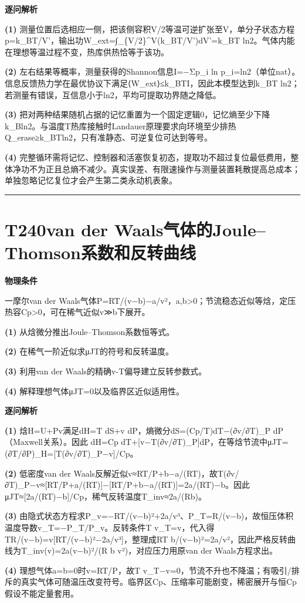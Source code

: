 \documentclass[UTF8,a4paper,11pt,oneside,openany]{ctexbook}
\begin{document}
\par\medskip\noindent\textbf{逐问解析}
\par\noindent\textbf{(1)} 测量位置后选相应一侧，把该侧容积V/2等温可逆扩张至V，单分子状态方程p=k\_BT/V'，输出功W\_ext=∫\_\{V/2\}\textasciicircum{}V(k\_BT/V')dV'=k\_BT ln2。气体内能在理想等温过程不变，热库供热恰等于该功。
\par\noindent\textbf{(2)} 左右结果等概率，测量获得的Shannon信息I=−Σp\_i ln p\_i=ln2（单位nat）。信息反馈热力学在最优协议下满足⟨W\_ext⟩≤k\_BTI，因此本模型达到k\_BT ln2；若测量有错误，互信息小于ln2，平均可提取功界随之降低。
\par\noindent\textbf{(3)} 把对两种结果随机占据的记忆重置为一个固定逻辑0，记忆熵至少下降k\_Bln2。与温度T热库接触时Landauer原理要求向环境至少排热Q\_erase≥k\_BTln2，只有准静态、可逆复位可达到等号。
\par\noindent\textbf{(4)} 完整循环需将记忆、控制器和活塞恢复初态，提取功不超过复位最低费用，整体净功不为正且总熵不减少。真实误差、有限速操作与测量装置耗散提高总成本；单独忽略记忆复位才会产生第二类永动机表象。

\par\bigskip\hrule\bigskip
\section*{T240\quad van der Waals气体的Joule–Thomson系数和反转曲线}
\textbf{物理条件}\par 一摩尔van der Waals气体P=RT/(v−b)−a/v²，a,b>0；节流稳态近似等焓，定压热容Cp>0，可在稀气近似v≫b下展开。
\par\noindent\textbf{(1)} 从焓微分推出Joule–Thomson系数恒等式。
\par\noindent\textbf{(2)} 在稀气一阶近似求μJT的符号和反转温度。
\par\noindent\textbf{(3)} 利用van der Waals的精确v-T偏导建立反转参数式。
\par\noindent\textbf{(4)} 解释理想气体μJT=0以及临界区近似适用性。

\par\medskip\noindent\textbf{逐问解析}
\par\noindent\textbf{(1)} 焓H=U+Pv满足dH=T dS+v dP，熵微分dS=(Cp/T)dT−(∂v/∂T)\_P dP（Maxwell关系）。因此 dH=Cp dT+[v−T(∂v/∂T)\_P]dP，在等焓节流中μJT=(∂T/∂P)\_H=[T(∂v/∂T)\_P−v]/Cp。
\par\noindent\textbf{(2)} 低密度van der Waals反解近似v≈RT/P+b−a/(RT)，故T(∂v/∂T)\_P−v≈[RT/P+a/(RT)]−[RT/P+b−a/(RT)]=2a/(RT)−b。因此μJT≈[2a/(RT)−b]/Cp，稀气反转温度T\_inv≈2a/(Rb)。
\par\noindent\textbf{(3)} 由隐式状态方程求P\_v=−RT/(v−b)²+2a/v³、P\_T=R/(v−b)，故恒压体积温度导数v\_T=−P\_T/P\_v。反转条件T v\_T=v，代入得TR/(v−b)=v[RT/(v−b)²−2a/v³]，整理成RT b/(v−b)²=2a/v²，因此严格反转曲线为T\_inv(v)=2a(v−b)²/(R b v²)，对应压力用原van der Waals方程求出。
\par\noindent\textbf{(4)} 理想气体a=b=0时v=RT/P，故T v\_T−v=0，节流不升也不降温；有吸引/排斥的真实气体可随温压改变符号。临界区Cp、压缩率可能剧变，稀密展开与恒Cp假设不能定量套用。
\end{document}
